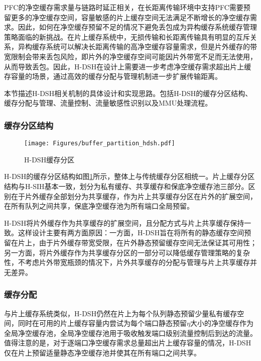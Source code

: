 PFC的净空缓存需求量与链路时延正相关，在长距离传输环境中支持PFC需要预留更多的净空缓存空间，容量敏感的片上缓存空间无法满足不断增长的净空缓存需求。因此，如何在净空缓存预留不足的情况下避免丢包成为异构缓存系统缓存管理策略面临的新挑战。在片上缓存系统中，无损传输和长距离传输具有明显的互斥关系，异构缓存系统可以解决长距离传输的高净空缓存容量需求，但是片外缓存的带宽限制会带来丢包风险，即片外的净空缓存空间可能因片外带宽不足而无法使用，从而导致丢包。因此，H-DSH在设计上需要进一步考虑净空缓存需求超出片上缓存容量的场景，通过高效的缓存分配与管理机制进一步扩展传输距离。



本节描述H-DSH相关机制的具体设计和实现思路。包括H-DSH的缓存分区结构、缓存分配与管理、流量控制、流量敏感性识别以及MMU处理流程。

\subsubsection{缓存分区结构}

\begin{figure}[H]
  \centering
  \texttt{[image: Figures/buffer\_partition\_hdsh.pdf]}
  \caption{H-DSH缓存分区}
  \label{c4:s1:ss1:fig:hdsh buffer partition}
\end{figure}


H-DSH的缓存分区结构如图\ref{c4:s1:ss1:fig:hdsh buffer partition}所示，整体上与传统缓存分区相统一。片上缓存分区结构与H-SIH基本一致，划分为私有缓存、共享缓存和保底净空缓存池三部分。区别在于片外缓存全部划分为共享缓存，作为片上共享缓存分区在片外的扩展空间，在所有队列之间共享，保底净空缓存池为所有端口全局预留。

H-DSH将片外缓存作为共享缓存的扩展空间，且分配方式与片上共享缓存保持一致。这样设计主要有两方面原因：一方面，H-DSH旨在将所有的静态缓存空间预留在片上，由于片外缓存带宽受限，在片外静态预留缓存空间无法保证其可用性；另一方面，将片外缓存作为共享缓存分区的一部分可以降低缓存管理策略的复杂性，不考虑片外带宽瓶颈的情况下，片外共享缓存的分配与管理与片上共享缓存并无差异。


\subsubsection{缓存分配}

与片上缓存系统类似，H-DSH仍然在片上为每个队列静态预留少量私有缓存空间，同时在可用的片上缓存容量内尝试为每个端口静态预留$\eta$大小的净空缓存作为全局净空缓存池，全局净空缓存池用于吸收触发端口级别流量控制后到达的流量。值得注意的是，对于逐端口净空缓存需求总量超出片上缓存容量的情况，H-DSH仅在片上预留适量静态净空缓存池并使其在所有端口之间共享。

